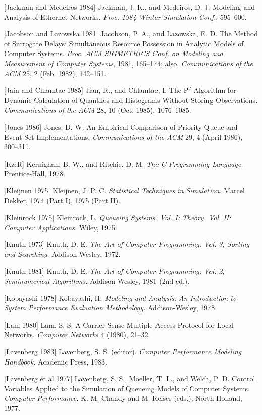 [Jackman and Medeiros 1984] Jackman, J. K., and Medeiros, D. J. Modeling and Analysis of Ethernet Networks. \textit{Proc. 1984 Winter Simulation Conf.}, 595--600.

[Jacobson and Lazowska 1981] Jacobson, P. A., and Lazowska, E. D. The Method of Surrogate Delays: Simultaneous Resource Possession in Analytic Models of Computer Systems. \textit{Proc. ACM SIGMETRICS Conf. on Modeling and Measurement of Computer Systems}, 1981, 165--174; also, \textit{Communications of the ACM} 25, 2 (Feb. 1982), 142--151.

[Jain and Chlamtac 1985] Jian, R., and Chlamtac, I. The P$^2$ Algorithm for Dynamic Calculation of Quantiles and Histograms Without Storing Observations. \textit{Communications of the ACM} 28, 10 (Oct. 1985), 1076--1085.

[Jones 1986] Jones, D. W. An Empirical Comparison of Priority-Queue and Event-Set Implementations. \textit{Communications of the ACM} 29, 4 (April 1986), 300--311.

[K\&R] Kernighan, B. W., and Ritchie, D. M. \textit{The C Programming Language.} Prentice-Hall, 1978.

[Kleijnen 1975] Kleijnen, J. P. C. \textit{Statistical Techniques in Simulation.} Marcel Dekker, 1974 (Part I), 1975 (Part II).

[Kleinrock 1975] Kleinrock, L. \textit{Queueing Systems. Vol. I: Theory. Vol. II: Computer Applications.} Wiley, 1975.

[Knuth 1973] Knuth, D. E. \textit{The Art of Computer Programming. Vol. 3, Sorting and Searching.} Addison-Wesley, 1972.

[Knuth 1981] Knuth, D. E. \textit{The Art of Computer Programming. Vol. 2, Seminumerical Algorithms.} Addison-Wesley, 1981 (2nd ed.).

[Kobayashi 1978] Kobayashi, H. \textit{Modeling and Analysis: An Introduction to System Performance Evaluation Methodology.} Addison-Wesley, 1978.

[Lam 1980] Lam, S. S. A Carrier Sense Multiple Access Protocol for Local Networks. \textit{Computer Networks} 4 (1980), 21--32.

[Lavenberg 1983] Lavenberg, S. S. (editor). \textit{Computer Performance Modeling Handbook.} Academic Press, 1983.

[Lavenberg et al 1977] Lavenberg, S. S., Moeller, T. L., and Welch, P. D. Control Variables Applied to the Simulation of Queueing Models of Computer Systems. \textit{Computer Performance.} K. M. Chandy and M. Reiser (eds.), North-Holland, 1977.

